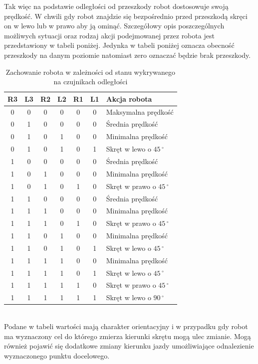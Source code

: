 Tak więc na podstawie odległości od przeszkody robot dostosowuje swoją
prędkość. W chwili gdy robot znajdzie się bezpośrednio przed przeszkodą skręci
on w lewo lub w prawo aby ją ominąć. Szczegółowy opis poszczególnych możliwych
sytuacji oraz rodzaj akcji podejmowanej przez robota jest przedstawiony w
tabeli poniżej. Jedynka w tabeli poniżej oznacza obecność przeszkody na danym
poziomie natomiast zero oznaczać będzie brak przeszkody.
\begin{table}[hb]
\centering
   	\begin{tabular}{ | c | c | c | c | c | c | p{5cm} |} \hline
   		R3 & L3 & R2 & L2 & R1 & L1 & Akcja robota \\ \hline
   		0  & 0  & 0  & 0  & 0  & 0  & Maksymalna prędkość\\ \hline
   		0  & 1  & 0  & 0  & 0  & 0  & Średnia prędkość \\ \hline
   		0  & 1  & 0  & 1  & 0  & 0  & Minimalna prędkość \\ \hline
   		0  & 1  & 0  & 1  & 0  & 1  & Skręt w lewo o $45\,^{\circ}$ \\ \hline 
   		1  & 0  & 0  & 0  & 0  & 0  & Średnia prędkość \\ \hline
   		1  & 0  & 1  & 0  & 0  & 0  & Minimalna prędkość \\ \hline
   		1  & 0  & 1  & 0  & 1  & 0  & Skręt w prawo o $45\,^{\circ}$  \\ \hline
   		1  & 1  & 0  & 0  & 0  & 0  & Średnia prędkość \\ \hline
   		1  & 1  & 1  & 0  & 0  & 0  & Minimalna prędkość \\ \hline
   		1  & 1  & 1  & 0  & 1  & 0  & Skręt w prawo o $45\,^{\circ}$ \\ \hline
   		1  & 1  & 0  & 1  & 0  & 0  & Minimalna prędkość \\ \hline
   		1  & 1  & 0  & 1  & 0  & 1  & Skręt w lewo o $45\,^{\circ}$ \\ \hline 
   		1  & 1  & 1  & 1  & 0  & 0  & Minimalna prędkość \\ \hline 
   		1  & 1  & 1  & 1  & 0  & 1  & Skręt w lewo o $45\,^{\circ}$ \\ \hline 
   		1  & 1  & 1  & 1  & 1  & 0  & Skręt w prawo o $45\,^{\circ}$ \\ \hline 
   		1  & 1  & 1  & 1  & 1  & 1  & Skręt w lewo o $90\,^{\circ}$ \\ \hline
   	\end{tabular}
\caption{Zachowanie robota w zależności od stanu wykrywanego na czujnikach odległości}
\label{ObstacleAvoidTable}
\end{table}\\
Podane w tabeli wartości mają charakter orientacyjny i w przypadku gdy robot ma
wyznaczony cel do którego zmierza kierunki skrętu mogą ulec zmianie. Mogą
również pojawić się dodatkowe zmiany kierunku jazdy umożliwiające odnalezienie
wyznaczonego punktu docelowego. \newpage

